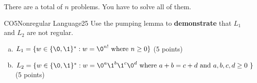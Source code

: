 \documentclass{article}
\begin{document}
\begin{examinstructions}
There are a total of \(n\) problems. You have to solve all of them.
\end{examinstructions}



\begin{problem}{1}{CO5}{Nonregular Language}{25}
Use the pumping lemma to \textbf{demonstrate} that \(L_1\) and \(L_2\) are not regular.

\begin{enumerate}[(a)]
\item \( L_1 = \{ w \in \{\0, \1\}^* : w = \0^{n!} \text{ where } n \geq 0 \} \) (5 points)
\item \( L_2 = \{ w \in \{\0, \1\}^* : w = \0^a\1^b\1^c \0^d\text{ where } a+b=c+d \text{ and }  a,b,c,d \geq 0 \  \} \) (5 points)
\end{enumerate}
\end{problem}
\end{document}
